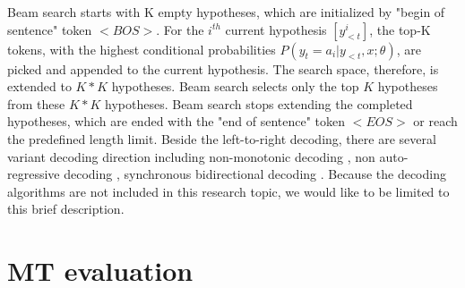 Beam search starts with K empty hypotheses, which are initialized by "begin of sentence" token $<BOS>$. For the $i^{th}$ current hypothesis $[y^{i}_{<t}]$, the top-K tokens, with the highest conditional probabilities $P(y_t = a_i | y_{<t},x;\theta)$, are picked and appended to the current hypothesis. The search space, therefore, is extended to $K*K$ hypotheses. Beam search selects only the top $K$ hypotheses from these $K*K$ hypotheses. Beam search stops extending the completed hypotheses, which are ended with the "end of sentence" token $<EOS>$ or reach the predefined length limit. Beside the left-to-right decoding, there are several variant decoding direction including non-monotonic decoding \citep{Welleck19non}, non auto-regressive decoding \citep{Jiatao17non}, synchronous bidirectional decoding \cite{Zhou19synchronous}. Because the decoding algorithms are not included in this research topic, we would like to be limited to this brief description.

\section{MT evaluation}







































